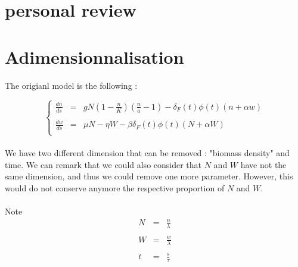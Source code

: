 \documentclass{article}
\begin{document}
\newpage

\section*{personal review}


\newpage
{}
%
%
%


%




\newpage
\appendix
{}

\newpage
\section{Adimensionnalisation}
\label{adim}

\paragraph{}
The origianl model is the following :

\[
\left\lbrace
\begin{array}{rcl}
\frac{dn}{ds} & = & gN(1-\frac{n}{K})(\frac{n}{a}-1) - \delta_F(t)\phi(t)(n+\alpha w) \\
\\
\frac{dw}{ds} & = & \mu N - \eta W - \beta\delta_F(t)\phi(t)(N+\alpha W) \\
\end{array}
\right.
\]

\paragraph{}
We have two different dimension that can be removed : "biomass density" and time. We can remark that we could also consider that $N$ and $W$ have not the same dimension, and thus we could remove one more parameter. However, this would do not conserve anymore the respective proportion of $N$ and $W$.

\paragraph{}
Note
\[
\begin{array}{rcl}
N & = & \frac{n}{\lambda} \\
\\
W & = & \frac{w}{\lambda} \\
\\
t & = & \frac{s}{\tau} \\
\end{array}
\]
\end{document}
